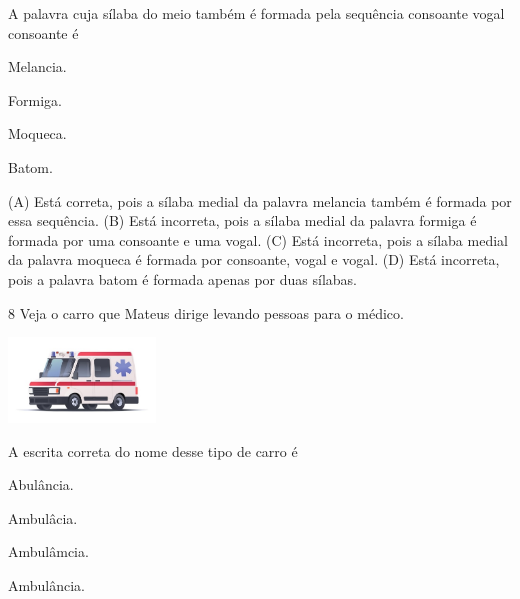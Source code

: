 
A palavra cuja sílaba do meio também é formada pela sequência consoante vogal consoante é

\begin{minipage}{.5\textwidth}
\begin{escolha}
\item Melancia.

\item Formiga.

\item Moqueca.

\item Batom.
\end{escolha}
\end{minipage}

(A) Está correta, pois a sílaba medial da palavra melancia também é formada por essa sequência.
(B) Está incorreta, pois a sílaba medial da palavra formiga é formada por uma consoante e uma vogal.
(C) Está incorreta, pois a sílaba medial da palavra moqueca é formada por consoante, vogal e vogal.
(D) Está incorreta, pois a palavra batom é formada apenas por duas sílabas.

\num{8} Veja o carro que Mateus dirige levando pessoas para o médico.

\includegraphics[width=1.54514in,height=0.89444in]{media/image153.jpeg}


A escrita correta do nome desse tipo de carro é

\begin{minipage}{.5\textwidth}
\begin{escolha}
\item Abulância.

\item Ambulâcia.

\item Ambulâmcia.

\item Ambulância.
\end{escolha}
\end{minipage}

